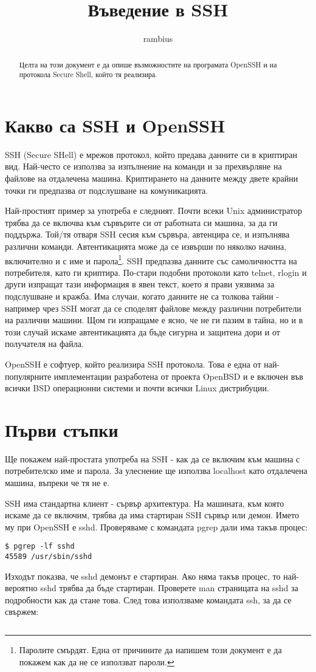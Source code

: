 \documentclass{article}
\title{Въведение в SSH}
\author{rambius}
\begin{document}
\maketitle
\begin{abstract}
Целта на този документ е да опише възможностите на програмата OpenSSH и на протокола Secure Shell, който тя реализира.
\end{abstract}

\section{Какво са SSH и OpenSSH}
SSH (Secure SHell) е мрежов протокол, който предава данните си в криптиран вид. Най-често се използва за изпълнение на команди и за прехвърляне на файлове на отдалечена машина. Криптирането на данните между двете крайни точки ги предпазва от подслушване на комуникацията.

Най-простият пример за употреба е следният. Почти всеки Unix администратор трябва да се включва към сървърите си от работната си машина, за да ги поддържа. Той/тя отваря SSH сесия към сървъра, автенцира се, и изпълнява различни команди. Автентикацията може да се извърши по няколко начина, включително и с име и парола\footnote{Паролите смърдят. Една от причините да напишем този документ е да покажем как да не се използват пароли.}. SSH предпазва данните със самоличността на потребителя, като ги криптира. По-стари подобни протоколи като telnet, rlogin и други изпращат тази информация в явен текст, което я прави уязвима за подслушване и кражба. Има случаи, когато данните не са толкова тайни - например чрез SSH могат да се споделят файлове между различни потребители на различни машини. Щом ги изпращаме е ясно, че не ги пазим в тайна, но и в този случай искаме автентикацията да бъде сигурна и защитена дори и от получателя на файла.

OpenSSH е софтуер, който реализира SSH протокола. Това е една от най-популярните имплементации разработена от проекта OpenBSD и е включен във всички BSD операционни системи и почти всички Linux дистрибуции.

\section{Първи стъпки}
Ще покажем най-простата употреба на SSH - как да се включим към машина с потребителско име и парола. За улеснение ще използва localhost като отдалечена машина, въпреки че тя не е.

SSH има стандартна клиент - сървър архитектура. На машината, към която искаме да се включим, трябва да има стартиран SSH сървър или демон. Името му при OpenSSH е sshd. Проверяваме с командата pgrep дали има такъв процес:
\begin{verbatim}
$ pgrep -lf sshd
45589 /usr/sbin/sshd
\end{verbatim}
Изходът показва, че sshd демонът е стартиран. Ако няма такъв процес, то най-вероятно sshd трябва да бъде стартиран. Проверете man страницата на sshd за подробности как да стане това.  След това използваме командата ssh, за да се свържем:
\begin{verbatim}
\end{verbatim}
\end{document}
